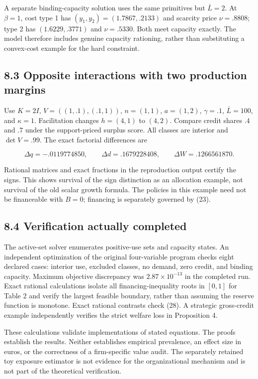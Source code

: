 \documentclass[
  11pt,
]{article}
\begin{document}
A separate binding-capacity solution uses the same primitives but
\(\bar L=2\). At \(\beta=1\), cost type 1 has
\((y_1,y_2)=(1.7867,.2133)\) and scarcity price \(\nu=.8808\); type 2
has \((1.6229,.3771)\) and \(\nu=.5330\). Both meet capacity exactly.
The model therefore includes genuine capacity rationing, rather than
substituting a convex-cost example for the hard constraint.

\subsection{8.3 Opposite interactions with two production
margins}\label{opposite-interactions-with-two-production-margins}

Use \(K=2I\), \(V=((1,.1),(.1,1))\), \(n=(1,1)\), \(a=(1,2)\),
\(\gamma=.1\), \(\bar L=100\), and \(\kappa=1\). Facilitation changes
\(h=(4,1)\) to \((4,2)\). Compare credit shares \(.4\) and \(.7\) under
the support-priced surplus score. All classes are interior and
\(\det V=.99\). The exact factorial differences are

\[\Delta q=-.0119774850,\qquad
\Delta d=.1679228408,\qquad
\Delta W=.1266561870. \tag{28}\]

Rational matrices and exact fractions in the reproduction output certify
the signs. This shows survival of the sign distinction as an allocation
example, not survival of the old scalar growth formula. The policies in
this example need not be financeable with \(B=0\); financing is
separately governed by (23).

\subsection{8.4 Verification actually
completed}\label{verification-actually-completed}

The active-set solver enumerates positive-use sets and capacity states.
An independent optimization of the original four-variable program checks
eight declared cases: interior use, excluded classes, no demand, zero
credit, and binding capacity. Maximum objective discrepancy was
\(2.87\times10^{-13}\) in the completed run. Exact rational calculations
isolate all financing-inequality roots in \([0,1]\) for Table 2 and
verify the largest feasible boundary, rather than assuming the reserve
function is monotone. Exact rational contrasts check (28). A strategic
gross-credit example independently verifies the strict welfare loss in
Proposition 4.

These calculations validate implementations of stated equations. The
proofs establish the results. Neither establishes empirical prevalence,
an effect size in euros, or the correctness of a firm-specific value
audit. The separately retained toy exposure estimator is not evidence
for the organizational mechanism and is not part of the theoretical
verification.
\end{document}
